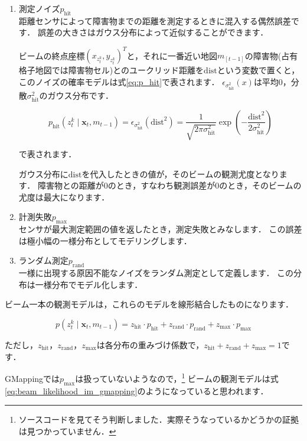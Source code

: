 \documentclass[{../../master}]{subfiles}
\begin{document}
\begin{enumerate}
  \item 測定ノイズ$p_{\text{hit}}$ \\
  距離センサによって障害物までの距離を測定するときに混入する偶然誤差です．
  誤差の大きさはガウス分布によって近似することができます．
  
  ビームの終点座標$(x_{z_{t}^k}, y_{z_{t}^k})^T$と，それに一番近い地図$m_[t-1]$の障害物(占有格子地図では障害物セル)とのユークリッド距離を$\text{dist}$という変数で置くと，このノイズの確率モデルは式\ref{eq:p_hit}で表されます．
  $\epsilon_{\sigma_{\text{hit}}^{2}}(x)$は平均0，分散$\sigma_{\text{hit}}^2$のガウス分布です．
  
  \begin{equation}
    p_{\text{hit}}(z_{t}^{k} \mid \bm{x}_{t}, m_{t-1}) = \epsilon_{\sigma_{\text{hit}}^{2}}(\text{dist}^2) = \frac{1}{\sqrt{2\pi \sigma_{\text{hit}}^2}} \exp\left(-\frac{\text{dist}^2}{2\sigma_{\text{hit}}^2}\right)
    \label{eq:p_hit}
  \end{equation}
  
  \noindent
  で表されます．
  
  ガウス分布に$\text{dist}$を代入したときの値が，そのビームの観測尤度となります．
  障害物との距離が0のとき，すなわち観測誤差が0のとき，そのビームの尤度は最大になります．
  \item 計測失敗$p_{\text{max}}$ \\
  センサが最大測定範囲の値を返したとき，測定失敗とみなします．
  この誤差は極小幅の一様分布としてモデリングします．
  \item ランダム測定$p_{\text{rand}}$ \\
  一様に出現する原因不能なノイズをランダム測定として定義します．
  この分布は一様分布でモデル化します．
\end{enumerate}

ビーム一本の観測モデルは，これらのモデルを線形結合したものになります．

\begin{equation}
  p(z_{t}^{k} \mid \bm{x}_{t}, m_{t-1}) = z_{\text{hit}} \cdot p_{\text{hit}} + z_{\text{rand}} \cdot p_{\text{rand}} + z_{\text{max}} \cdot p_{\text{max}}
  \label{eq:beam_likelihood}
\end{equation}

ただし，$z_{\text{hit}}$，$z_{\text{rand}}$，$z_{\text{max}}$は各分布の重みづけ係数で，$z_{\text{hit}} + z_{\text{rand}} + z_{\text{max}} = 1$です．

GMappingでは$p_{\text{max}}$は扱っていないようなので，\footnote{ソースコードを見てそう判断しました．実際そうなっているかどうかの証拠は見つかっていません．}
ビームの観測モデルは式\ref{eq:beam_likelihood_im_gmapping}のようになっていると思われます．
\end{document}
